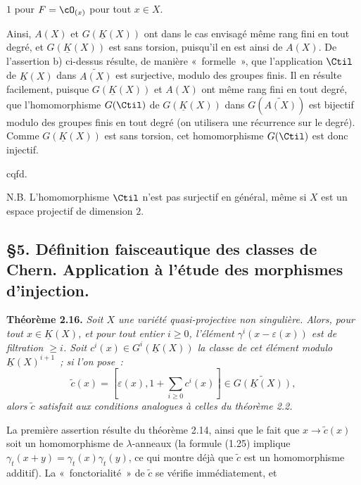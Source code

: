 $1$
pour $F=\cO_{(x)}$ pour tout $x\in X$.

Ainsi, $A(X)$ et $G(\underline K(X))$ ont dans le cas envisagé même rang fini en tout degré, et $G(\underline K(X))$ est sans torsion, puisqu'il en est ainsi de $A(X)$. De l'assertion b) ci-dessus résulte, de manière «~formelle~», que l'application $\Ctil$ de $\underline K(X)$ dans $\widetilde{A(X)}$ est surjective, modulo des groupes finis. Il en résulte facilement, puisque $G(\underline K(X))$ et $A(X)$ ont même rang fini en tout degré, que l'homomorphisme $G(\Ctil)$ de $G(\underline K(X))$ dans $G(\widetilde{A(X)})$ est bijectif modulo des groupes finis en tout degré (on utilisera une récurrence sur le degré). Comme $G(\underline K(X))$ est sans torsion, cet homomorphisme $G(\Ctil)$ est donc injectif.
\begin{flushright}cqfd.\end{flushright}

N.B. L'homomorphisme $\Ctil$ n'est pas surjectif en général, même si $X$ est un espace projectif de dimension $2$.

\subsection*{\S 5. Définition faisceautique des classes de Chern. Application à l'étude des morphismes d'injection.}

\textbf{Théorème 2.16.} \emph{Soit $X$ une variété quasi-projective non singulière. Alors, pour tout $x\in\underline K(X)$, et pour tout entier $i\geq0$, l'élément $\gamma^i(x-\varepsilon(x))$ est de filtration $\geq i$. Soit $c^i(x)\in G^i(\underline K(X))$ la classe de cet élément modulo $\underline K(X)^{i+1}$~; si l'on pose~:}
\[
 \widetilde c(x)=\left[\varepsilon(x),1+\sum_{i\geq0}c^i(x)\right]\in\widetilde{G(\underline K(X))},
\]
\emph{alors $\widetilde c$ satisfait aux conditions analogues à celles du théorème 2.2.}

La première assertion résulte du théorème 2.14, ainsi que le fait que $x\longrightarrow\widetilde c(x)$ soit un homomorphisme de $\lambda$-anneaux (la formule (1.25) implique $\gamma_t(x+y)=\gamma_t(x)\gamma_t(y)$, ce qui montre déjà que $\widetilde c$ est un homomorphisme additif). La «~fonctorialité~» de $\widetilde c$ se vérifie immédiatement, et 
